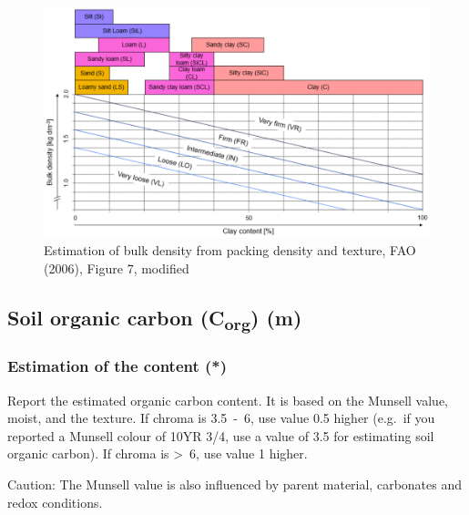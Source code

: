 \documentclass[
  letterpaper,
  DIV=11,
  numbers=noendperiod]{scrreprt}
\begin{document}
\begin{figure}

{\centering \includegraphics{./figure_8-21.png}

}

\caption{Estimation of bulk density from packing density and texture,
FAO (2006), Figure 7, modified}

\end{figure}

\hypertarget{soil-organic-carbon-corg-m}{%
\subsection{\texorpdfstring{Soil organic carbon (C\textsubscript{org})
(m)}{Soil organic carbon (Corg) (m)}}\label{soil-organic-carbon-corg-m}}

\hypertarget{estimation-of-the-content}{%
\subsubsection{Estimation of the content
(*)}\label{estimation-of-the-content}}

Report the estimated organic carbon content. It is based on the Munsell
value, moist, and the texture. If chroma is 3.5~-~6, use value 0.5
higher (e.g.~if you reported a Munsell colour of 10YR 3/4, use a value
of 3.5 for estimating soil organic carbon). If chroma is \textgreater~6,
use value 1 higher.

Caution: The Munsell value is also influenced by parent material,
carbonates and redox conditions.
\end{document}
